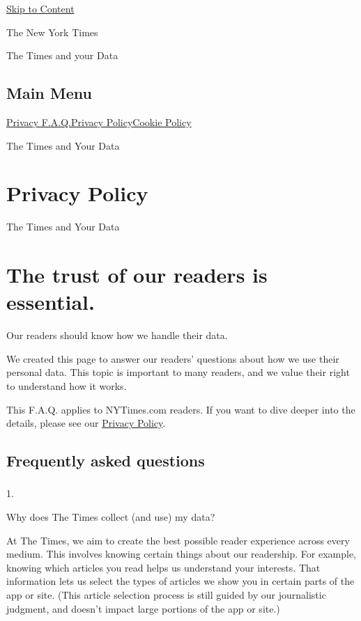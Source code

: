 \protect\hyperlink{main-content}{Skip to Content}

The New York Times

The Times and your Data

\hypertarget{main-menu}{%
\subsection{Main Menu}\label{main-menu}}

\href{/privacy}{Privacy F.A.Q.}\href{/privacy/privacy-policy}{Privacy
Policy}\href{/privacy/cookie-policy}{Cookie Policy}

The Times and Your Data

\hypertarget{privacy-policy}{%
\section{Privacy Policy}\label{privacy-policy}}

The Times and Your Data

\hypertarget{the-trust-of-our-readers-is-essential}{%
\section{The trust of our readers is
essential.}\label{the-trust-of-our-readers-is-essential}}

Our readers should know how we handle their data.

We created this page to answer our readers' questions about how we use
their personal data. This topic is important to many readers, and we
value their right to understand how it works.

This F.A.Q. applies to NYTimes.com readers. If you want to dive deeper
into the details, please see our \href{/privacy/privacy-policy}{Privacy
Policy}.

\hypertarget{frequently-asked-questions}{%
\subsection{Frequently asked
questions}\label{frequently-asked-questions}}

\subsubsection{}

1.

Why does The Times collect (and use) my data?

At The Times, we aim to create the best possible reader experience
across every medium. This involves knowing certain things about our
readership. For example, knowing which articles you read helps us
understand your interests. That information lets us select the types of
articles we show you in certain parts of the app or site. (This article
selection process is still guided by our journalistic judgment, and
doesn't impact large portions of the app or site.)

